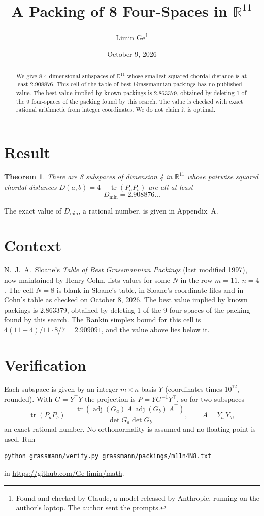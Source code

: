 \documentclass[11pt,a4paper]{article}
\title{A Packing of 8 Four-Spaces in $\mathbb{R}^{11}$}
\author{Limin Ge\thanks{Found and checked by Claude, a model released by Anthropic, running on the author's laptop. The author sent the prompts.}}
\date{October 9, 2026}
\newtheorem*{theorem}{Theorem}
\begin{document}
\maketitle
\begin{abstract}
We give 8 4-dimensional subspaces of $\mathbb{R}^{11}$ whose smallest squared chordal distance is at least 2.908876. This cell of the table of best Grassmannian packings has no published value. The best value implied by known packings is 2.863379, obtained by deleting 1 of the 9 four-spaces of the packing found by this search. The value is checked with exact rational arithmetic from integer coordinates. We do not claim it is optimal.
\end{abstract}

\section{Result}
\begin{theorem}
There are 8 subspaces of dimension 4 in $\mathbb{R}^{11}$ whose pairwise squared chordal distances $D(a,b) = 4 - \operatorname{tr}(P_aP_b)$ are all at least
\[ D_{\min} = 2.908876\ldots \]
\end{theorem}
The exact value of $D_{\min}$, a rational number, is given in Appendix~A.


\section{Context}
N.~J.~A.~Sloane's \emph{Table of Best Grassmannian Packings} (last modified 1997), now maintained by Henry Cohn, lists values for some $N$ in the row $m=11$, $n=4$. The cell $N=8$ is blank in Sloane's table, in Sloane's coordinate files and in Cohn's table as checked on October 8, 2026. The best value implied by known packings is 2.863379, obtained by deleting 1 of the 9 four-spaces of the packing found by this search. The Rankin simplex bound for this cell is $4(11-4)/11\cdot 8/7 = 2.909091$, and the value above lies below it.


\section{Verification}
Each subspace is given by an integer $m\times n$ basis $Y$ (coordinates times $10^{12}$, rounded). With $G=Y^\top Y$ the projection is $P=YG^{-1}Y^\top$, so for two subspaces
\[ \operatorname{tr}(P_aP_b)=\frac{\operatorname{tr}(\operatorname{adj}(G_a)\,A\,\operatorname{adj}(G_b)\,A^\top)}{\det G_a\det G_b},\qquad A=Y_a^\top Y_b, \]
an exact rational number. No orthonormality is assumed and no floating point is used. Run
\begin{verbatim}
python grassmann/verify.py grassmann/packings/m11n4N8.txt
\end{verbatim}
in \url{https://github.com/Ge-limin/math}.
\end{document}
